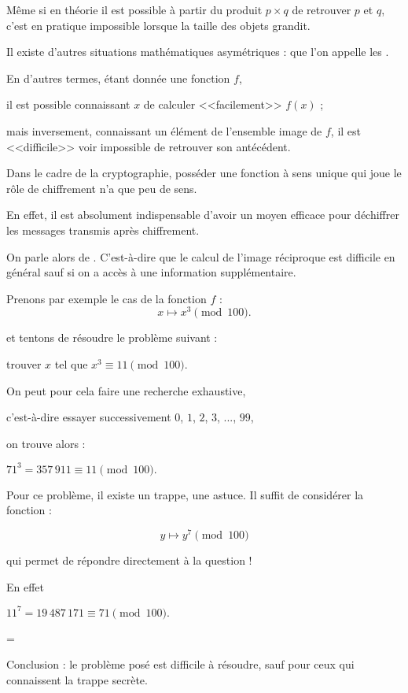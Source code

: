 Même si en théorie il est possible à partir du produit $p\times q$ de retrouver $p$ et $q$, 
c'est en pratique impossible lorsque la taille des objets grandit.


\diapo

Il existe d'autres situations mathématiques asymétriques :
que l'on appelle les .

\change
En d'autres termes, étant donnée une fonction $f$, 

\change
il est possible connaissant $x$ de calculer <<facilement>> $f(x)$ ;

\change
mais inversement, connaissant un élément de l'ensemble image de $f$, il est <<difficile>> voir impossible 
de retrouver son antécédent. 

\change
Dans le cadre de la cryptographie, posséder une fonction à sens 
unique qui joue le rôle de chiffrement n'a que peu de sens. 

En effet, il est absolument indispensable d'avoir un moyen efficace pour déchiffrer les messages 
transmis après chiffrement. 

On parle alors de . C'est-à-dire que le calcul de l'image réciproque est difficile en général sauf si on a accès à une information supplémentaire.

\change
Prenons par exemple le cas de la fonction $f$  : $$x \longmapsto x^3 \pmod{100}.$$

et tentons de résoudre le problème suivant : 

trouver $x$ tel que $x^3 \equiv 11 \pmod{100}$.

\change
On peut pour cela faire une recherche exhaustive, 

c'est-à-dire essayer successivement 
  $0$, $1$, $2$, $3$, ...,  $99$, 
  
\change 
on trouve alors : 

$71^3=357\,911 \equiv 11 \pmod{100}.$
    
\change
Pour ce problème, il existe un trappe, une astuce. Il suffit de considérer la fonction :

$$y \longmapsto y^7 \pmod{100}$$

qui permet de répondre directement à la question !

En effet 

$11^7= 19\,487\,171 \equiv 71 \pmod{100}.$

=

Conclusion : le problème posé est difficile à résoudre, sauf pour ceux qui 
connaissent la trappe secrète. 

